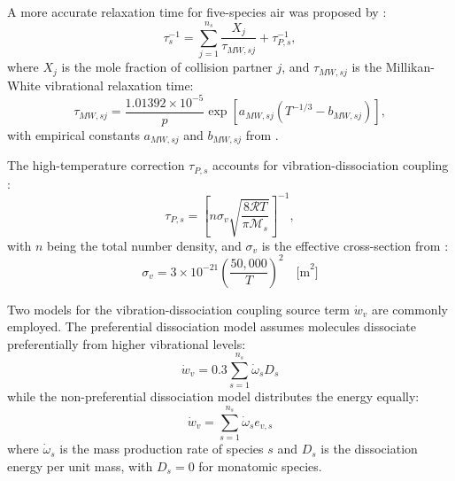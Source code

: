 A more accurate relaxation time for five-species air was proposed by \cite{Park1993}:
\begin{equation}
    \tau_s^{-1} = \sum_{j=1}^{n_s} \frac{X_j}{\tau_{MW,sj}} + \tau_{P,s}^{-1}, 
\end{equation}
where $X_j$ is the mole fraction of collision partner $j$, and $\tau_{MW,sj}$ is the Millikan-White vibrational relaxation time:
\begin{equation}
    \tau_{MW,sj} = \frac{1.01392 \times 10^{-5}}{p} \exp\left[a_{MW,sj} \left( T^{-1/3} - b_{MW,sj} \right)\right], 
\end{equation}
with empirical constants $a_{MW,sj}$ and $b_{MW,sj}$ from \cite{Park1993}.

The high-temperature correction $\tau_{P,s}$ accounts for vibration-dissociation coupling \cite{Park1990}:
\begin{equation}
    \tau_{P,s} = \left[ n \sigma_{v} \sqrt{\frac{8 \mathcal{R} T}{\pi \mathcal{M}_s}} \right]^{-1}, 
\end{equation}
with $n$ being the total number density, and $\sigma_{v}$ is the effective cross-section from \cite{Park1993}:
\begin{equation}
    \sigma_{v} = 3 \times 10^{-21} \left(\frac{50{,}000}{T}\right)^2 \quad \text{[m}^2\text{]}
\end{equation}

Two models for the vibration-dissociation coupling source term $\dot{w}_v$ are commonly employed. The preferential dissociation model assumes molecules dissociate preferentially from higher vibrational levels:
\begin{equation}
    \dot{w}_{v} = 0.3 \sum_{s=1}^{n_s} \dot{\omega}_{s} D_{s}
\end{equation}
while the non-preferential dissociation model distributes the energy equally:
\begin{equation}
    \dot{w}_{v} = \sum_{s=1}^{n_s} \dot{\omega}_s e_{v,s}
\end{equation}
where $\dot{\omega}_s$ is the mass production rate of species $s$ and $D_s$ is the dissociation energy per unit mass, with $D_s = 0$ for monatomic species.

